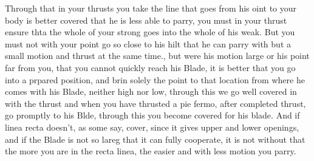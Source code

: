 \newpage


\newpage



Through that in your thrusts you take the line that goes from his oint
to your body is better covered that he is less able to parry, you must
in your thrust ensure thta the whole of your strong goes into the
whole of his weak. But you must not with your point go so close to his
hilt that he can parry with but a small motion and thrust at the same
time., but were his motion large or his point far from you, that you
cannot quickly reach his Blade, it is better that you go into a
prpared position, and brin solely the point to that location from
where he comes with his Blade, neither high nor low, through this we
go well covered in with the thrust and when you have thrusted a pie
fermo, after completed thrust, go promptly to his Blde, through this
you become covered for his blade. And if linea recta doesn't, as some
say, cover, since it gives upper and lower openings, and if the Blade
is not so lareg that it can fully cooperate, it is not without that
the more you are in the recta linea, the easier and with less motion
you parry.


